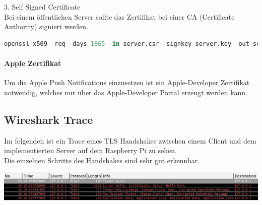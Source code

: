 3. Self Signed Certificate\\
Bei einem öffentlichen Server sollte das Zertifikat bei einer CA (Certificate Authority) signiert werden. \\
\begin{lstlisting}[caption =Self Signed Certificate, language=python, frame=single, breaklines=true,columns=fullflexible, commentstyle=\color{gray}\upshape, captionpos=b]
openssl x509 -req -days 1865 -in server.csr -signkey server.key -out server.crt
\end{lstlisting}

\paragraph{Apple Zertifikat}
Um die Apple Push Notifications einzusetzen ist ein Apple-Developer Zertifikat notwendig, welches nur über das Apple-Developer Portal erzeugt werden kann.

\subsection{Wireshark Trace}
Im folgenden ist ein Trace eines TLS Handshakes zwischen einem Client und dem implementierten Server auf dem Raspberry Pi zu sehen. \\
Die einzelnen Schritte des Handshakes sind sehr gut erkennbar.\\
\begin{minipage}{\linewidth}
            \centering
            \includegraphics[width=\textwidth]{./data/wireshark.png}
        \end{minipage}